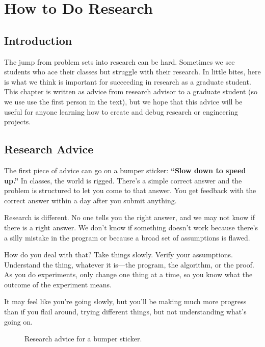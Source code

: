 
\chapter{How to Do Research}
\label{chapter:how_to_do_research}

\section{Introduction}

The jump from problem sets into research 
can be hard.  Sometimes we see students who ace their
classes but struggle with their research.  In little bites, here is what we think is important for succeeding in research as a graduate student.  This chapter is written as advice from research advisor to a graduate student (so we use use the first person in the text), but we hope that this advice will be useful for anyone learning how to create and debug research or engineering projects.

\section{Research Advice}

The first piece of advice can go on a bumper sticker: {\bf ``Slow down to speed up.''}   In
  classes, the world is rigged.  There's a simple correct answer and the problem is structured to let you come to that answer.  You get  feedback with the correct answer within a day after you submit  anything.

Research is different.  No one tells you the right answer, and we may not know if there is a right answer.  We don't know if something doesn't work because there's a  silly mistake in the program or because a broad set of assumptions is flawed.

How do you deal with that?  Take things slowly.  Verify your
assumptions.  Understand the thing, whatever it is---the program, the algorithm,  or the
proof.  As you do experiments, only change one thing at a time, so you know what the outcome of the experiment means.

It may feel like you're going slowly, but you'll be making much more progress than if you flail around, trying different things, but not understanding what's going on. \\

\begin{figure}[htpb!]
\centerline{}
\caption{Research advice for a bumper sticker.}
\label{fig:vw}
\end{figure}


